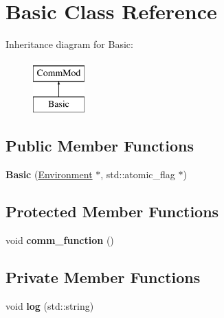 \hypertarget{class_basic}{}\section{Basic Class Reference}
\label{class_basic}
Inheritance diagram for Basic\+:\begin{figure}[H]
\begin{center}
\leavevmode
\includegraphics[height=2.000000cm]{class_basic}
\end{center}
\end{figure}
\subsection*{Public Member Functions}
\begin{DoxyCompactItemize}
\item 
{\bfseries Basic} (\hyperlink{class_environment}{Environment} $\ast$, std\+::atomic\+\_\+flag $\ast$)\hypertarget{class_basic_a07314fa25d6ae09c6f7db834f8b44305}{}\label{class_basic_a07314fa25d6ae09c6f7db834f8b44305}

\end{DoxyCompactItemize}
\subsection*{Protected Member Functions}
\begin{DoxyCompactItemize}
\item 
void {\bfseries comm\+\_\+function} ()\hypertarget{class_basic_a736b2bb76e936ed7f5cb20b6c166b76a}{}\label{class_basic_a736b2bb76e936ed7f5cb20b6c166b76a}

\end{DoxyCompactItemize}
\subsection*{Private Member Functions}
\begin{DoxyCompactItemize}
\item 
void {\bfseries log} (std\+::string)\hypertarget{class_basic_aa8a33a9f24b0750579c27a5214368e35}{}\label{class_basic_aa8a33a9f24b0750579c27a5214368e35}

\end{DoxyCompactItemize}
